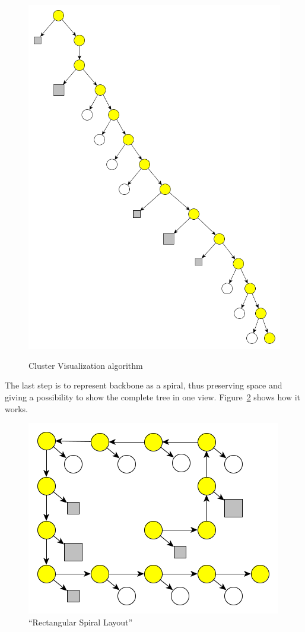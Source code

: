 \begin{figure}[h!]
{    \includegraphics[scale=0.15]{pictures/cluster_visualisation_algorithm_3.png}
    \label{fig:cluster_visualisation_algorithm_3}
}
\caption{Cluster Visualization algorithm}
\label{fig:cluster_visualisation_algorithm}
\end{figure}

The last step is to represent backbone as a spiral, thus preserving space and giving a possibility to show the complete tree in one view.
Figure~\ref{fig:cluster_visualisation_algorithm_4} shows how it works.

\begin{figure}[h!]
\centering
\includegraphics[scale=0.5]{pictures/cluster_visualisation_algorithm_4.png}
\caption{``Rectangular Spiral Layout''}
\label{fig:cluster_visualisation_algorithm_4}
\end{figure}

